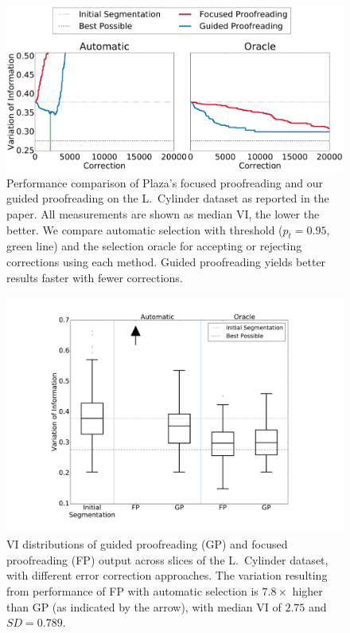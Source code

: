 \begin{figure}[t]
\centering
\includegraphics[width=\linewidth]{gfx/cyl_trails.pdf}
\caption{Performance comparison of Plaza's focused proofreading and our guided proofreading on the L.~Cylinder dataset as reported in the paper. All measurements are shown as median VI, the lower the better. We compare automatic selection with threshold ($p_t=0.95$, green line) and the selection oracle for accepting or rejecting corrections using each method. Guided proofreading yields better results faster with fewer corrections.}
\label{fig:cyltrails}
\end{figure}

\begin{figure}[t]
\centering
\includegraphics[width=\linewidth]{gfx/cylboxplot.pdf}
\caption{VI distributions of guided proofreading (GP) and focused proofreading (FP) output across slices of the L.~Cylinder dataset, with different error correction approaches. The variation resulting from performance of FP with automatic selection is $7.8\times$ higher than GP (as indicated by the arrow), with median VI of $2.75$ and $SD=0.789$.}
\label{fig:cylboxplot}
\end{figure}

